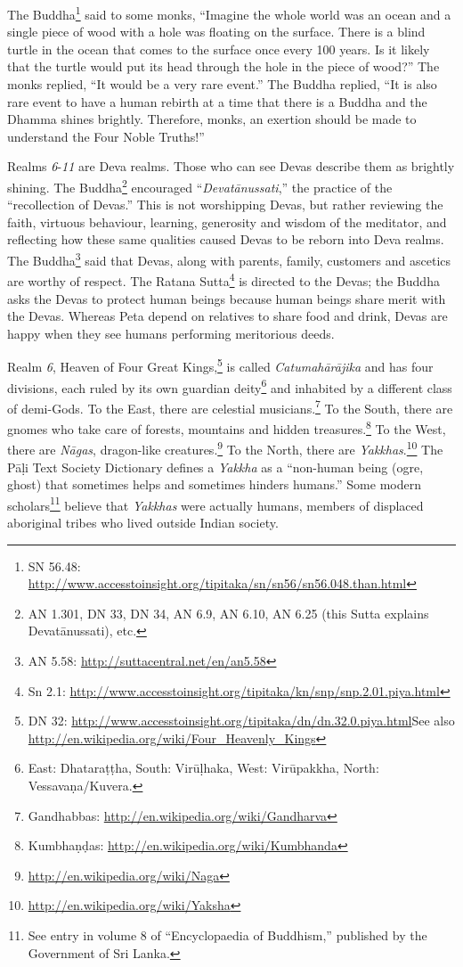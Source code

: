 The Buddha\footnote{SN 56.48: \url{http://www.accesstoinsight.org/tipitaka/sn/sn56/sn56.048.than.html}} said to some monks, “Imagine the whole world was an ocean and a single piece of wood with a hole was floating on the surface. There is a blind turtle in the ocean that comes to the surface once every 100 years. Is it likely that the turtle would put its head through the hole in the piece of wood?” The monks replied, “It would be a very rare event.” The Buddha replied, “It is also rare event to have a human rebirth at a time that there is a Buddha and the Dhamma shines brightly. Therefore, monks, an exertion should be made to understand the Four Noble Truths!”

Realms \textit{6}-\textit{11} are Deva realms. Those who can see Devas describe them as brightly shining. The Buddha\footnote{AN 1.301, DN 33, DN 34, AN 6.9, AN 6.10, AN 6.25 (this Sutta explains Devatānussati), etc.} encouraged “\textit{Devatānussati},” the practice of the “recollection of Devas.” This is not worshipping Devas, but rather reviewing the faith, virtuous behaviour, learning, generosity and wisdom of the meditator, and reflecting how these same qualities caused Devas to be reborn into Deva realms. The Buddha\footnote{AN 5.58: \url{http://suttacentral.net/en/an5.58}} said that Devas, along with parents, family, customers and ascetics are worthy of respect. The Ratana Sutta\footnote{Sn 2.1: \url{http://www.accesstoinsight.org/tipitaka/kn/snp/snp.2.01.piya.html}} is directed to the Devas; the Buddha asks the Devas to protect human beings because human beings share merit with the Devas. Whereas Peta depend on relatives to share food and drink, Devas are happy when they see humans performing meritorious deeds.

Realm \textit{6}, Heaven of Four Great Kings,\footnote{DN 32: \url{http://www.accesstoinsight.org/tipitaka/dn/dn.32.0.piya.html}\newline See also \url{http://en.wikipedia.org/wiki/Four_Heavenly_Kings}} is called \textit{Catumahārājika} and has four divisions, each ruled by its own guardian deity\footnote{East: Dhataraṭṭha, South: Virūḷhaka, West: Virūpakkha, North: Vessavaṇa/Kuvera.} and inhabited by a different class of demi-Gods. To the East, there are celestial musicians.\footnote{Gandhabbas: \url{http://en.wikipedia.org/wiki/Gandharva}} To the South, there are gnomes who take care of forests, mountains and hidden treasures.\footnote{Kumbhaṇḍas: \url{http://en.wikipedia.org/wiki/Kumbhanda}} To the West, there are \textit{Nāgas}, dragon-like creatures.\footnote{\url{http://en.wikipedia.org/wiki/Naga}} To the North, there are \textit{Yakkhas}.\footnote{\url{http://en.wikipedia.org/wiki/Yaksha}} The Pāḷi Text Society Dictionary defines a \textit{Yakkha} as a “non-human being (ogre, ghost) that sometimes helps and sometimes hinders humans.” Some modern scholars\footnote{See entry in volume 8 of “Encyclopaedia of Buddhism,” published by the Government of Sri Lanka.} believe that \textit{Yakkhas} were actually humans, members of displaced aboriginal tribes who lived outside Indian society.

